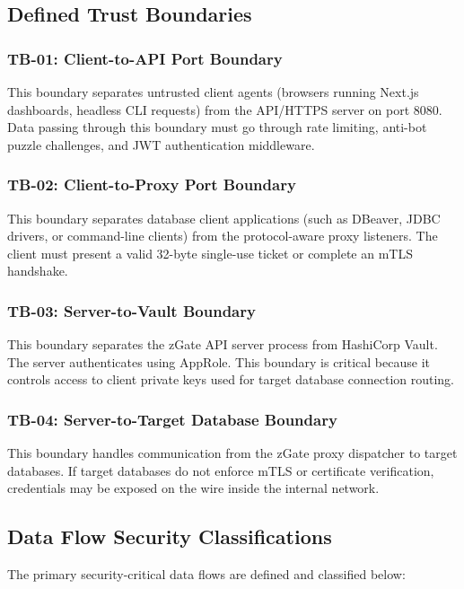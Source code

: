 \subsection{Defined Trust Boundaries}

\subsubsection{TB-01: Client-to-API Port Boundary}
This boundary separates untrusted client agents (browsers running Next.js dashboards, headless CLI requests) from the API/HTTPS server on port 8080. Data passing through this boundary must go through rate limiting, anti-bot puzzle challenges, and JWT authentication middleware.

\subsubsection{TB-02: Client-to-Proxy Port Boundary}
This boundary separates database client applications (such as DBeaver, JDBC drivers, or command-line clients) from the protocol-aware proxy listeners. The client must present a valid 32-byte single-use ticket or complete an mTLS handshake.

\subsubsection{TB-03: Server-to-Vault Boundary}
This boundary separates the zGate API server process from HashiCorp Vault. The server authenticates using AppRole. This boundary is critical because it controls access to client private keys used for target database connection routing.

\subsubsection{TB-04: Server-to-Target Database Boundary}
This boundary handles communication from the zGate proxy dispatcher to target databases. If target databases do not enforce mTLS or certificate verification, credentials may be exposed on the wire inside the internal network.

\subsection{Data Flow Security Classifications}

The primary security-critical data flows are defined and classified below:

